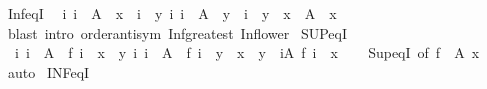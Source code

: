 \begin{isabellebody}
\endisatagproof
{\isafoldproof}%
%
\isadelimproof
\isanewline
%
\endisadelimproof
\isanewline
{}\isamarkupfalse%
\ Inf{\isacharunderscore}{\kern0pt}eqI{\isacharcolon}{\kern0pt}\isanewline
\ \ {\isachardoublequoteopen}{\isacharparenleft}{\kern0pt}{\isasymAnd}i{\isachardot}{\kern0pt}\ i\ {\isasymin}\ A\ {\isasymLongrightarrow}\ x\ {\isasymle}\ i{\isacharparenright}{\kern0pt}\ {\isasymLongrightarrow}\ {\isacharparenleft}{\kern0pt}{\isasymAnd}y{\isachardot}{\kern0pt}\ {\isacharparenleft}{\kern0pt}{\isasymAnd}i{\isachardot}{\kern0pt}\ i\ {\isasymin}\ A\ {\isasymLongrightarrow}\ y\ {\isasymle}\ i{\isacharparenright}{\kern0pt}\ {\isasymLongrightarrow}\ y\ {\isasymle}\ x{\isacharparenright}{\kern0pt}\ {\isasymLongrightarrow}\ {\isasymSqinter}A\ {\isacharequal}{\kern0pt}\ x{\isachardoublequoteclose}\isanewline
%
\isadelimproof
\ \ %
\endisadelimproof
%
\isatagproof
{}\isamarkupfalse%
\ {\isacharparenleft}{\kern0pt}blast\ intro{\isacharcolon}{\kern0pt}\ order{\isachardot}{\kern0pt}antisym\ Inf{\isacharunderscore}{\kern0pt}greatest\ Inf{\isacharunderscore}{\kern0pt}lower{\isacharparenright}{\kern0pt}%
\endisatagproof
{\isafoldproof}%
%
\isadelimproof
\isanewline
%
\endisadelimproof
\isanewline
{}\isamarkupfalse%
\ SUP{\isacharunderscore}{\kern0pt}eqI{\isacharcolon}{\kern0pt}\isanewline
\ \ {\isachardoublequoteopen}{\isacharparenleft}{\kern0pt}{\isasymAnd}i{\isachardot}{\kern0pt}\ i\ {\isasymin}\ A\ {\isasymLongrightarrow}\ f\ i\ {\isasymle}\ x{\isacharparenright}{\kern0pt}\ {\isasymLongrightarrow}\ {\isacharparenleft}{\kern0pt}{\isasymAnd}y{\isachardot}{\kern0pt}\ {\isacharparenleft}{\kern0pt}{\isasymAnd}i{\isachardot}{\kern0pt}\ i\ {\isasymin}\ A\ {\isasymLongrightarrow}\ f\ i\ {\isasymle}\ y{\isacharparenright}{\kern0pt}\ {\isasymLongrightarrow}\ x\ {\isasymle}\ y{\isacharparenright}{\kern0pt}\ {\isasymLongrightarrow}\ {\isacharparenleft}{\kern0pt}{\isasymSqunion}i{\isasymin}A{\isachardot}{\kern0pt}\ f\ i{\isacharparenright}{\kern0pt}\ {\isacharequal}{\kern0pt}\ x{\isachardoublequoteclose}\isanewline
%
\isadelimproof
\ \ %
\endisadelimproof
%
\isatagproof
{}\isamarkupfalse%
\ Sup{\isacharunderscore}{\kern0pt}eqI\ {\isacharbrackleft}{\kern0pt}of\ {\isachardoublequoteopen}f\ {\isacharbackquote}{\kern0pt}\ A{\isachardoublequoteclose}\ x{\isacharbrackright}{\kern0pt}\ \isamarkupfalse%
\ auto%
\endisatagproof
{\isafoldproof}%
%
\isadelimproof
\isanewline
%
\endisadelimproof
\isanewline
{}\isamarkupfalse%
\ INF{\isacharunderscore}{\kern0pt}eqI{\isacharcolon}{\kern0pt}\isanewline

\end{isabellebody}
